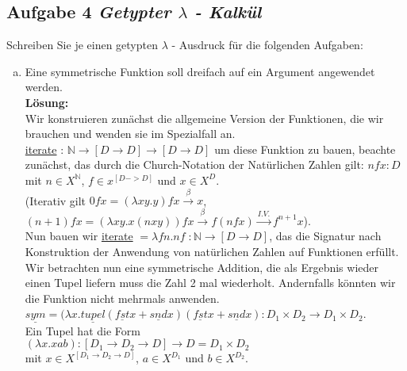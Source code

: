 \documentclass[11pt,a4paper,ngerman]{article}
\begin{document}
\subsection*{Aufgabe 4 \mdseries\itshape Getypter $\lambda$ - Kalkül}
Schreiben Sie je einen getypten $\lambda$ - Ausdruck für die folgenden Aufgaben:
\begin{enumerate}[(a)]
	\item Eine symmetrische Funktion soll dreifach auf ein Argument angewendet werden.\\
   \textbf{Lösung:}\\
      Wir konstruieren zunächst die allgemeine Version der Funktionen, die wir brauchen
      und wenden sie im Spezialfall an.\\
      \underline{iterate} : $\mathbb{N} \rightarrow [D \rightarrow D] \rightarrow [D \rightarrow D]$ um diese
      Funktion zu bauen, beachte zunächst, das durch die Church-Notation der
      Natürlichen Zahlen gilt: $n f x: D$ mit $n \in X^{\mathbb{N}}$, $f \in x^{[D->D]}$ und
      $x \in X^D$.\\
      (Iterativ gilt $0 f x = (\lambda xy.y) f x \overset{\beta}{\rightarrow} x$,\\
      $(n+1) f x = (\lambda xy.x(n x y)) f x \overset{\beta}{\rightarrow} f (n f x) \overset{I.V.}{\rightarrow}
         f^{n+1} x$).\\
      Nun bauen wir 
      \underline{iterate} $= \lambda f n. n f \; : \mathbb{N} \rightarrow [D \rightarrow D]$,
      das die Signatur nach Konstruktion der Anwendung von natürlichen Zahlen auf Funktionen erfüllt.\\

      Wir betrachten nun eine symmetrische Addition, die als Ergebnis wieder einen Tupel liefern muss
      die Zahl 2 mal wiederholt. Andernfalls könnten wir die Funktion nicht mehrmals anwenden.\\

      $\underline{sym} = (\lambda x. \underline{tupel} (\underline{fst} x + \underline{snd} x) 
         (\underline{fst}x + \underline{snd}x) : D_1 \times D_2 \rightarrow D_1 \times D_2$.\\

      Ein Tupel hat die Form \\
      $(\lambda x. x a b) : [D_1 \rightarrow D_2 \rightarrow D] \rightarrow D = D_1 \times D_2$\\
      mit $x \in X^{[D_1 \rightarrow D_2 \rightarrow D]}$, $a \in X^{D_1}$ und $b \in X^{D_2}$.\\


\end{enumerate}
\end{document}
